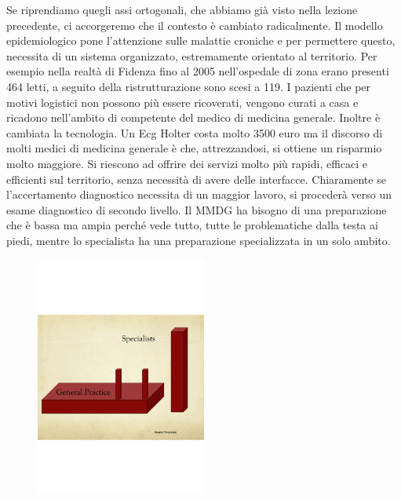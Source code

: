 Se riprendiamo quegli assi ortogonali, che abbiamo già visto nella
lezione precedente, ci accorgeremo che il contesto è cambiato
radicalmente. Il modello epidemiologico pone l'attenzione sulle malattie
croniche e per permettere questo, necessita di un sistema organizzato,
estremamente orientato al territorio. Per esempio nella realtà di
Fidenza fino al 2005 nell'ospedale di zona erano presenti 464 letti, a
seguito della ristrutturazione sono scesi a 119. I pazienti che per
motivi logistici non possono più essere ricoverati, vengono curati a
casa e ricadono nell'ambito di competente del medico di medicina
generale. Inoltre è cambiata la tecnologia. Un Ecg Holter costa molto
3500 euro ma il discorso di molti medici di medicina generale è che,
attrezzandosi, si ottiene un risparmio molto maggiore. Si riescono ad
offrire dei servizi molto più rapidi, efficaci e efficienti sul
territorio, senza necessità di avere delle interfacce. Chiaramente se
l'accertamento diagnostico necessita di un maggior lavoro, si procederà
verso un esame diagnostico di secondo livello. Il MMDG ha bisogno di una
preparazione che è bassa ma ampia perché vede tutto, tutte le
problematiche dalla testa ai piedi, mentre lo specialista ha una
preparazione specializzata in un solo ambito.

\begin{figure}[!ht]
\centering
	\includegraphics[width=0.5\textwidth]{38/image10.png}
	\end{figure}
	
